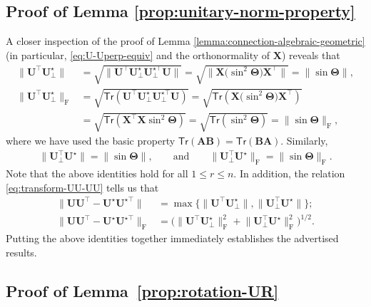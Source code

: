 \subsection{Proof of Lemma \ref{prop:unitary-norm-property}}
A closer inspection  of the proof of Lemma \ref{lemma:connection-algebraic-geometric} (in particular,  \eqref{eq:U-Uperp-equiv} and the orthonormality of $\bm{X}$) reveals that
%
\begin{align*}
\big\|\bm{U}^{\top}\bm{U}_{\perp}^{\star}\big\| & =\sqrt{\big\|\bm{U}^{\top}\bm{U}_{\perp}^{\star}\bm{U}_{\perp}^{\star\top}\bm{U}\big\|}=\sqrt{\|\bm{X}\big(\sin^{2}\bm{\Theta}\big)\bm{X}^{\top}\|}=\|\sin\bm{\Theta}\|,\\
\big\|\bm{U}^{\top}\bm{U}_{\perp}^{\star}\big\|_{\mathrm{F}} & =\sqrt{\mathsf{Tr}(\bm{U}^{\top}\bm{U}_{\perp}^{\star}\bm{U}_{\perp}^{\star\top}\bm{U})}=\sqrt{\mathsf{Tr}(\bm{X}\big(\sin^{2}\bm{\Theta}\big)\bm{X}^{\top})}\\
 & =\sqrt{\mathsf{Tr}(\bm{X}^{\top}\bm{X}\sin^{2}\bm{\Theta})}=\sqrt{\mathsf{Tr}(\sin^{2}\bm{\Theta})}=\|\sin\bm{\Theta}\|_{\mathrm{F}},
\end{align*}
%
where we have used the basic property $\mathsf{Tr}(\bm{A}\bm{B})=\mathsf{Tr}(\bm{B}\bm{A})$. Similarly,
%
\begin{align*}
\big\|\bm{U}_{\perp}^{\top}\bm{U}^{\star}\big\| =\|\sin\bm{\Theta}\|, 
	\qquad \text{and} \qquad
\big\|\bm{U}_{\perp}^{\top}\bm{U}^{\star}\big\|_{\mathrm{F}} =\|\sin\bm{\Theta}\|_{\mathrm{F}}.
\end{align*}
%
Note that the above identities hold for all $1\leq r\leq n$. In addition, the relation \eqref{eq:transform-UU-UU} tells us that
%
\begin{subequations}
\begin{align}
	\big\|\bm{U}\bm{U}^{\top}-\bm{U}^{\star}\bm{U}^{\star\top}\big\| &= \max\big\{\big\|\bm{U}^{\top}\bm{U}_{\perp}^{\star}\big\|,\big\|\bm{U}_{\perp}^{\top}\bm{U}^{\star}\big\|\big\}; \\
	\big\|\bm{U}\bm{U}^{\top}-\bm{U}^{\star}\bm{U}^{\star\top}\big\|_{\mathrm{F}} & =\Big(\big\|\bm{U}^{\top}\bm{U}_{\perp}^{\star}\big\|_{\mathrm{F}}^{2}+\big\|\bm{U}_{\perp}^{\top}\bm{U}^{\star}\big\|_{\mathrm{F}}^{2}\Big)^{1/2}.
\end{align}
\end{subequations}
%
Putting the above identities together immediately establishes the advertised results.




\subsection{Proof of Lemma~\ref{prop:rotation-UR}}
\label{proof:equiv-rotation-dist}



